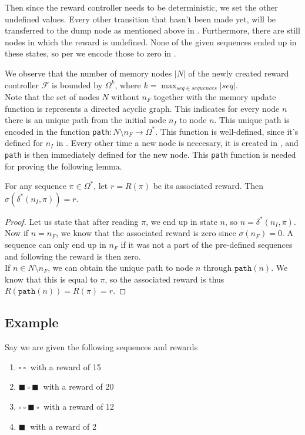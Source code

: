 Then since the reward controller needs to be deterministic, we set the other undefined values. Every other transition that hasn't been made yet, will be transferred to the dump node as mentioned above in . Furthermore, there are still nodes in which the reward is undefined. None of the given sequences ended up in these states, so per  we encode those to zero in .

We observe that the number of memory nodes $|N|$ of the newly created reward controller $\mathcal{F}$ is bounded by $\Omega^k$, where $k=\max_{seq\in sequences} |seq|$.\\

Note that the set of nodes $N$ without $n_F$ together with the memory update function is represents a directed acyclic graph. This indicates for every node $n$ there is an unique path from the initial node $n_I$ to node $n$. This unique path is encoded in the function \texttt{path}$:N\setminus n_F\to\Omega^*$. This function is well-defined, since it's defined for $n_I$ in . Every other time a new node is neccesary, it is created in , and \texttt{path} is then immediately defined for the new node. This \texttt{path} function is needed for proving the following lemma. 


\begin{lemma}
For any sequence $\pi\in\Omega^*$, let $r=R(\pi)$ be its associated reward. Then $\sigma(\delta^*(n_I,\pi))=r$.
\begin{proof}
Let us state that after reading $\pi$, we end up in state $n$, so $n = \delta^*(n_I,\pi)$. \\
Now if $n=n_F$, we know that the associated reward is zero since $\sigma(n_F)=0$. A sequence can only end up in $n_F$ if it was not a part of the pre-defined sequences and following  the reward is then zero. \\
If $n\in N\setminus n_F$, we can obtain the unique path to node $n$ through $\texttt{path}(n)$. We know that this is equal to $\pi$, so the associated reward is thus $R(\texttt{path}(n))=R(\pi)=r$.
\end{proof}
\end{lemma}


\subsection*{Example}
Say we are given the following sequences and rewards
\begin{enumerate}
	\item $\square\ \square\  $ with a reward of 15
	\item $\blacksquare\ \square\ \blacksquare\ $ with a reward of 20
	\item $\square\ \square\ \blacksquare\ \square\ $ with a reward of 12
	\item  $\blacksquare\ $ with a reward of 2
\end{enumerate}

